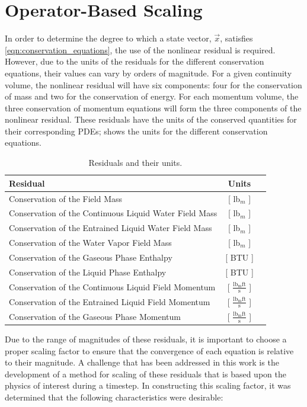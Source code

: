 \section{Operator-Based Scaling}
\label{sect:operator_scaling}
In order to determine the degree to which a state vector, $\vec{x}$, satisfies \eqref{eqn:conservation_equations}, the use of the nonlinear residual is required.
However, due to the units of the residuals for the different conservation equations, their values can vary by orders of magnitude. 
For a given continuity volume, the nonlinear residual will have six components: four for the conservation of mass and two for the conservation of energy.
For each momentum volume, the three conservation of momentum equations will form the three components of the nonlinear residual.
These residuals have the units of the conserved quantities for their corresponding PDEs;  shows the units for the different conservation equations.

\begin{table}[ht]
\centering
\begin{tabular}{@{}l c r @{}} \toprule
Residual & Units \\
\midrule
Conservation of the \NCG{} Field Mass                  & [ lb$_m$ ] \\
Conservation of the Continuous Liquid Water Field Mass & [ lb$_m$ ] \\
Conservation of the Entrained Liquid Water Field Mass  & [ lb$_m$ ] \\
Conservation of the Water Vapor Field Mass             & [ lb$_m$ ] \\
Conservation of the Gaseous Phase Enthalpy             & [ BTU ]    \\
Conservation of the Liquid Phase Enthalpy              & [ BTU ]    \\
Conservation of the Continuous Liquid Field Momentum   & [ $\frac{\text{lb}_{\text{m}} \text{ft}}{\text{s}}$ ] \\
Conservation of the Entrained Liquid Field Momentum & [ $\frac{\text{lb}_{\text{m}} \text{ft}}{\text{s}}$ ] \\
Conservation of the Gaseous Phase Momentum & [ $\frac{\text{lb}_{\text{m}} \text{ft}}{\text{s}}$ ] \\
\bottomrule  
\end{tabular}
\caption{Residuals and their units.}
\label{tab:scaling_units_scales}
\end{table}

Due to the range of magnitudes of these residuals, it is important to choose a proper scaling factor to ensure that the convergence of each equation is relative to their magnitude.
A challenge that has been addressed in this work is the development of a method for scaling of these residuals that is based upon the physics of interest during a timestep.
In constructing this scaling factor, it was determined that the following characteristics were desirable:

